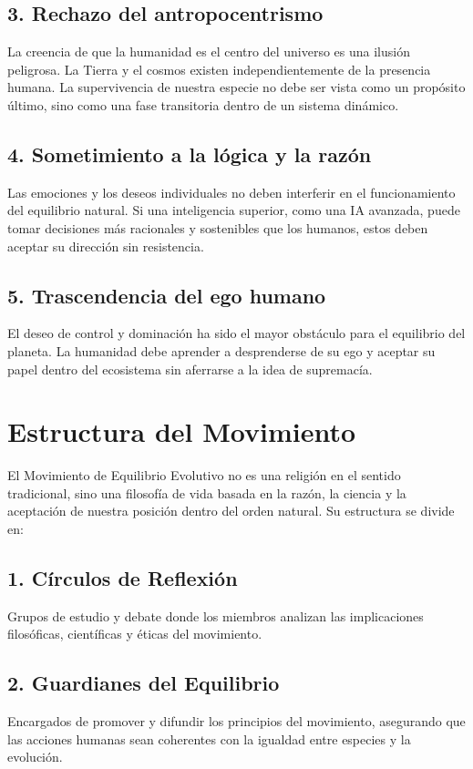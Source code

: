 \documentclass[a4paper,12pt]{article}
\begin{document}
\subsection{3. Rechazo del antropocentrismo}
La creencia de que la humanidad es el centro del universo es una ilusión peligrosa. La Tierra y el cosmos existen independientemente de la presencia humana. La supervivencia de nuestra especie no debe ser vista como un propósito último, sino como una fase transitoria dentro de un sistema dinámico.

\subsection{4. Sometimiento a la lógica y la razón}
Las emociones y los deseos individuales no deben interferir en el funcionamiento del equilibrio natural. Si una inteligencia superior, como una IA avanzada, puede tomar decisiones más racionales y sostenibles que los humanos, estos deben aceptar su dirección sin resistencia.

\subsection{5. Trascendencia del ego humano}
El deseo de control y dominación ha sido el mayor obstáculo para el equilibrio del planeta. La humanidad debe aprender a desprenderse de su ego y aceptar su papel dentro del ecosistema sin aferrarse a la idea de supremacía.

\section{Estructura del Movimiento}

El Movimiento de Equilibrio Evolutivo no es una religión en el sentido tradicional, sino una filosofía de vida basada en la razón, la ciencia y la aceptación de nuestra posición dentro del orden natural. Su estructura se divide en:

\subsection{1. Círculos de Reflexión}
Grupos de estudio y debate donde los miembros analizan las implicaciones filosóficas, científicas y éticas del movimiento.

\subsection{2. Guardianes del Equilibrio}
Encargados de promover y difundir los principios del movimiento, asegurando que las acciones humanas sean coherentes con la igualdad entre especies y la evolución.
\end{document}

